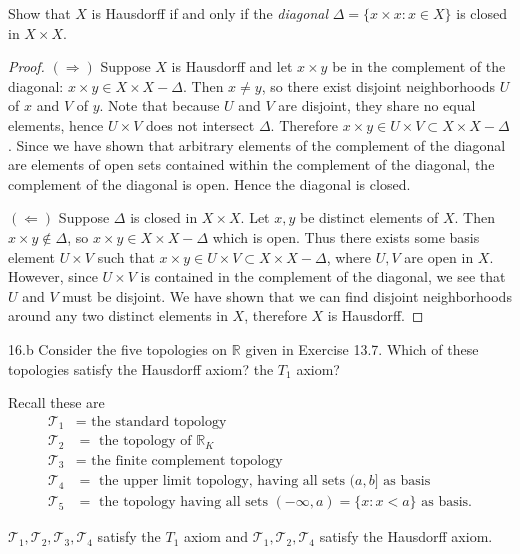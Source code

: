 \documentclass[11pt]{article}
\begin{document}
\begin{ex}{13}
  Show that $X$ is Hausdorff if and only if the \emph{diagonal} $\Delta = \{x
  \times x : x \in X\}$ is closed in $X \times X$.
\end{ex}
\begin{proof}
  $(\Rightarrow)$ Suppose $X$ is Hausdorff and let $x\times y$ be in the complement of
  the diagonal: $x\times y \in X \times X - \Delta$. Then $x \neq y$, so there
  exist disjoint neighborhoods $U$ of $x$ and $V$ of $y$. Note that because $U$
  and $V$ are disjoint, they share no equal elements, hence $U \times V$ does
  not intersect $\Delta$. Therefore $x \times y \in U \times V \subset X \times
  X - \Delta$. Since we have shown that arbitrary elements of the complement of
  the diagonal are elements of open sets contained within the complement of the
  diagonal, the complement of the diagonal is open. Hence the diagonal is
  closed.

  $(\Leftarrow)$ Suppose $\Delta$ is closed in $X \times X$. Let $x,y$ be
  distinct elements of $X$. Then $x \times y \notin \Delta$, so $x \times y \in
  X \times X - \Delta$ which is open. Thus there exists some basis element $U
  \times V$ such that $x \times y \in U \times V \subset X \times X - \Delta$,
  where $U, V$ are open in $X$. However, since $U \times V$ is contained in the
  complement of the diagonal, we see that $U$ and $V$ must be disjoint. We have
  shown that we can find disjoint neighborhoods around any two distinct elements
  in $X$, therefore $X$ is Hausdorff.
\end{proof}

\begin{ex}{16.b}
  Consider the five topologies on $\mathbb{R}$ given in Exercise 13.7. Which of
  these topologies satisfy the Hausdorff axiom? the $T_1$ axiom?
\end{ex}
\begin{solution}
  Recall these are
  \begin{align*}
    \mathcal{T}_1 &= \text{ the standard topology } \\
    \mathcal{T}_2 &= \text{ the topology of } \mathbb{R}_K \\
    \mathcal{T}_3 &= \text{ the finite complement topology } \\
    \mathcal{T}_4 &= \text{ the upper limit topology, having all sets }
                (a, b]
                \text { as basis} \\
    \mathcal{T}_5 &= \text{ the topology having all sets }
                (-\infty, a) = \{x : x < a\}
                \text { as basis}.
  \end{align*}

  $\mathcal{T}_1, \mathcal{T}_2, \mathcal{T}_3, \mathcal{T}_4$ satisfy the $T_1$
  axiom and $\mathcal{T}_1, \mathcal{T}_2, \mathcal{T}_4$ satisfy the Hausdorff
  axiom.
\end{solution}
\end{document}
